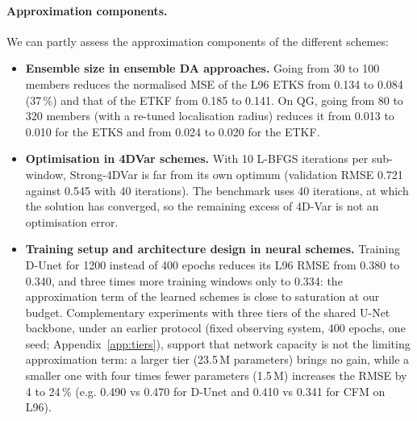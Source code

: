 \paragraph{Approximation components.} We can partly assess the approximation components of the different schemes:
\begin{itemize}[leftmargin=*,nosep]
  \item \textbf{Ensemble size in ensemble DA approaches.} Going from 30 to 100 members reduces the normalised MSE
    of the L96 ETKS from 0.134 to 0.084 (37\,\%) and that of the ETKF from 0.185 to
    0.141. On QG, going from 80 to 320 members (with a re-tuned localisation radius)
    reduces it from 0.013 to 0.010 for the ETKS and from 0.024 to 0.020 for the ETKF.
  \item \textbf{Optimisation in 4DVar schemes.} With 10 L-BFGS iterations per sub-window,
    Strong-4DVar is far from its own optimum (validation RMSE 0.721 against 0.545 with
    40 iterations). The benchmark uses 40 iterations, at which the solution has
    converged, so the remaining excess of 4D-Var is not an optimisation error.
  \item \textbf{Training setup and architecture design in neural schemes.} Training D-Unet 
  for 1200 instead of 400 epochs reduces its L96 RMSE from 0.380 to 0.340, and three times more training windows only to 0.334: the approximation term of the learned schemes is close to saturation at our budget.
  Complementary experiments with three tiers of the shared U-Net backbone, under an
  earlier protocol (fixed observing system, 400 epochs, one seed;
  Appendix~\ref{app:tiers}), support that network capacity is not the limiting
  approximation term: a larger tier (23.5\,M parameters) brings no gain, while a
  smaller one with four times fewer parameters (1.5\,M) increases the RMSE by 4 to
  24\,\% (e.g. 0.490 vs 0.470 for D-Unet and 0.410 vs 0.341 for CFM on L96).
\end{itemize}

